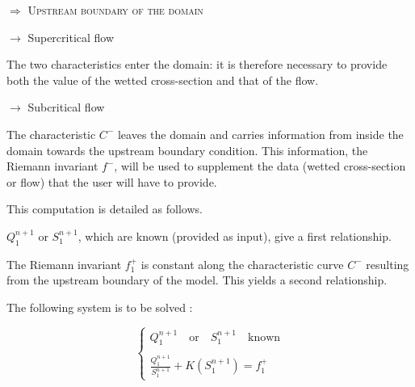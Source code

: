 \vspace{0.5cm}

$\Longrightarrow$ \textsc{Upstream boundary of the domain}

\vspace{0.5cm}

$\rightarrow$ Supercritical flow

\vspace{0.5cm}

The two characteristics enter the domain: it is therefore necessary to provide both the value of the wetted cross-section and that of the flow.

\vspace{0.5cm}

$\rightarrow$ Subcritical flow

\vspace{0.5cm}

The characteristic $C^-$ leaves the domain and carries information from inside the domain towards the upstream boundary condition. This information, the Riemann invariant $f^-$, will be used to supplement the data (wetted cross-section or flow) that the user will have to provide.

\vspace{0.5cm}

This computation is detailed as follows.

\vspace{0.5cm}

$Q_1^{n+1}$ or $S_1^{n+1}$, which are known (provided as input), give a first relationship.

\vspace{0.5cm}

The Riemann invariant $f_{1}^+$ is constant along the characteristic curve $C^-$ resulting from the upstream boundary of the model. This yields a second relationship.

\vspace{0.5cm}

The following system is to be solved :

\begin{equation}
 \left \lbrace
  \begin{array}{l}
    Q_{1}^{n+1} \quad \mbox{or} \quad S_{1}^{n+1} \quad \mbox{known} \\
    \\
    \frac{Q_{1}^{n+1}}{S_{1}^{n+1}} + K(S_{1}^{n+1}) = f_{1}^+
  \end{array}
 \right.
\end{equation}

